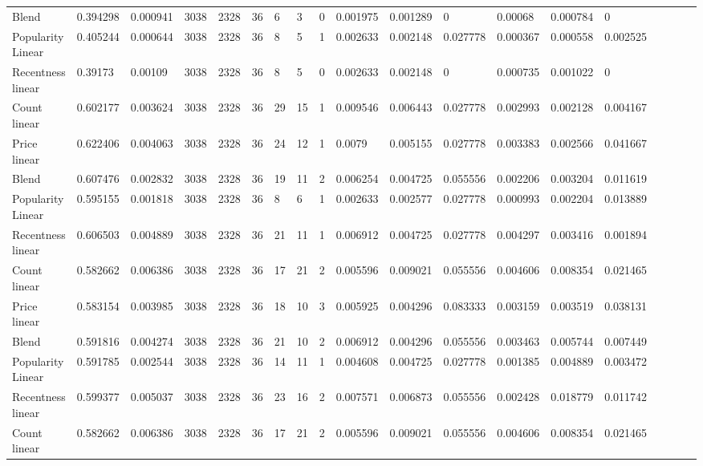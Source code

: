 \begin{table}[H]
{\begin{tabular}{*{19}l}
Blend				&	0.394298 &	0.000941 &	3038 &	2328 &	36 &	6  &	3 &		0 &	0.001975 &	0.001289 &	0 		 &	0.00068  &	0.000784 &	0 &	 \\
Popularity Linear	&	0.405244 &	0.000644 &	3038 &	2328 &	36 &	8  &	5 &		1 &	0.002633 &	0.002148 &	0.027778 &	0.000367 &	0.000558 &	0.002525 &	 \\
Recentness linear	&	0.39173  &	0.00109 &	3038 &	2328 &	36 &	8  &	5 &		0 &	0.002633 &	0.002148 &	0 		 &	0.000735 &	0.001022 &	0 &	 \\
Count linear		&	0.602177 &	0.003624 &	3038 &	2328 &	36 &	29 &	15 &	1 &	0.009546 &	0.006443 &	0.027778 &	0.002993 &	0.002128 &	0.004167 &	 \\
Price linear		&	0.622406 &	0.004063 &	3038 &	2328 &	36 &	24 &	12 &	1 &	0.0079   &	0.005155 &	0.027778 &	0.003383 &	0.002566 &	0.041667 &	 \\
Blend				&	0.607476 &	0.002832 &	3038 &	2328 &	36 &	19 &	11 &	2 &	0.006254 &	0.004725 &	0.055556 &	0.002206 &	0.003204 &	0.011619 &	 \\
Popularity Linear	&	0.595155 &	0.001818 &	3038 &	2328 &	36 &	8  &	6  &	1 &	0.002633 &	0.002577 &	0.027778 &	0.000993 &	0.002204 &	0.013889 &	 \\
Recentness linear	&	0.606503 &	0.004889 &	3038 &	2328 &	36 &	21 &	11 &	1 &	0.006912 &	0.004725 &	0.027778 &	0.004297 &	0.003416 &	0.001894 &	 \\
Count linear		&	0.582662 &	0.006386 &	3038 &	2328 &	36 &	17 &	21 &	2 &	0.005596 &	0.009021 &	0.055556 &	0.004606 &	0.008354 &	0.021465 &	 \\
Price linear		&	0.583154 &	0.003985 &	3038 &	2328 &	36 &	18 &	10 &	3 &	0.005925 &	0.004296 &	0.083333 &	0.003159 &	0.003519 &	0.038131 &	 \\
Blend				&	0.591816 &	0.004274 &	3038 &	2328 &	36 &	21 &	10 &	2 &	0.006912 &	0.004296 &	0.055556 &	0.003463 &	0.005744 &	0.007449 &	 \\
Popularity Linear	&	0.591785 &	0.002544 &	3038 &	2328 &	36 &	14 &	11 &	1 &	0.004608 &	0.004725 &	0.027778 &	0.001385 &	0.004889 &	0.003472 &	 \\
Recentness linear	&	0.599377 &	0.005037 &	3038 &	2328 &	36 &	23 &	16 &	2 &	0.007571 &	0.006873 &	0.055556 &	0.002428 &	0.018779 &	0.011742 &	 \\
Count linear		&	0.582662 &	0.006386 &	3038 &	2328 &	36 &	17 &	21 &	2 &	0.005596 &	0.009021 &	0.055556 &	0.004606 &	0.008354 &	0.021465 &	 \\

\end{tabular}}
\end{table}
